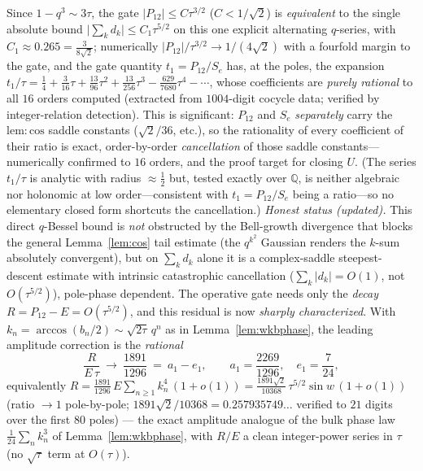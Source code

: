 \begin{remark}
Since $1-q^3\sim3\tau$, the gate $|P_{12}|\le C\tau^{3/2}$ ($C<1/\sqrt2$) is \emph{equivalent} to the single
absolute bound $\bigl|\sum_kd_k\bigr|\le C_1\tau^{5/2}$ on this one explicit alternating $q$-series, with
$C_1\approx0.265=\tfrac3{8\sqrt2}$; numerically $|P_{12}|/\tau^{3/2}\to1/(4\sqrt2)$ with a fourfold margin to the
gate, and the gate quantity $t_1=P_{12}/S_e$ has, at the poles, the expansion $t_1/\tau=\tfrac14+\tfrac3{16}
\tau+\tfrac{13}{96}\tau^2+\tfrac{13}{256}\tau^3-\tfrac{629}{7680}\tau^4-\cdots$, whose coefficients are
\emph{purely rational} to all $16$ orders computed (extracted from $1004$-digit cocycle data; verified by
integer-relation detection). This is significant: $P_{12}$ and $S_e$ \emph{separately} carry the
$\mathrm{lem:cos}$ saddle constants ($\sqrt2/36$, etc.), so the rationality of every coefficient of their
ratio is exact, order-by-order \emph{cancellation} of those saddle constants---numerically confirmed to $16$
orders, and the proof target for closing $U$. (The series $t_1/\tau$ is analytic with radius $\approx\tfrac12$
but, tested exactly over $\mathbb Q$, is neither algebraic nor holonomic at low order---consistent with
$t_1=P_{12}/S_e$ being a ratio---so no elementary closed form shortcuts the cancellation.) \emph{Honest status \textup(updated\textup).} This direct $q$-Bessel bound is \emph{not} obstructed by the
Bell-growth divergence that blocks the general Lemma~\ref{lem:cos} tail estimate (the $q^{k^2}$ Gaussian renders
the $k$-sum absolutely convergent), but on $\sum_kd_k$ alone it is a complex-saddle steepest-descent estimate
with intrinsic catastrophic cancellation ($\sum_k|d_k|=O(1)$, not $O(\tau^{5/2})$), pole-phase dependent. The
operative gate needs only the \emph{decay} $R=P_{12}-E=O(\tau^{5/2})$, and this residual is now \emph{sharply
characterized}. With $k_n=\arccos(b_n/2)\sim\sqrt{2\tau}\,q^n$ as in Lemma~\ref{lem:wkbphase}, the leading
amplitude correction is the \emph{rational}
\begin{equation}\label{eq:ampcorr}
   \frac{R}{E\,\tau}\ \longrightarrow\ \frac{1891}{1296}\ =\ a_1-e_1,\qquad
   a_1=\frac{2269}{1296},\quad e_1=\frac{7}{24},
\end{equation}
equivalently $R=\tfrac{1891}{1296}\,E\sum_{n\ge1}k_n^4\,(1+o(1))=\tfrac{1891\sqrt2}{10368}\,\tau^{5/2}\sin
w\,(1+o(1))$ (ratio $\to1$ pole-by-pole; $1891\sqrt2/10368=0.257935749\ldots$ verified to $21$ digits over the
first $80$ poles) --- the exact amplitude analogue of the bulk phase law $\tfrac1{24}\sum_nk_n^3$ of
Lemma~\ref{lem:wkbphase}, with $R/E$ a clean integer-power series in $\tau$ (no $\sqrt\tau$ term at $O(\tau)$).

\end{remark}

